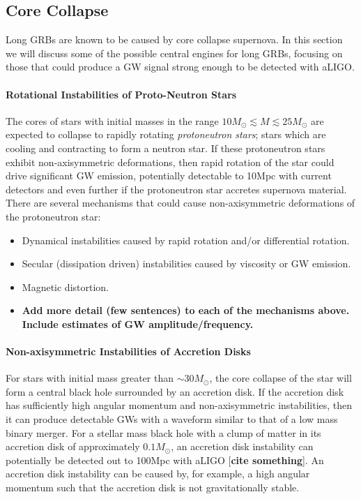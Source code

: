 \documentclass[11pt]{cuthesis}
\begin{document}
\subsection{Core Collapse}
Long GRBs are known to be caused by core collapse supernova. In this section we will discuss some of the possible central engines for long GRBs, focusing on those that could produce a GW signal strong enough to be detected with aLIGO. 

\paragraph{Rotational Instabilities of Proto-Neutron Stars} 
The cores of stars with initial masses in the range $10M_\odot \lesssim M \lesssim 25M_\odot$ are expected to collapse to rapidly rotating \textit{protoneutron stars}; stars which are cooling and contracting to form a neutron star. If these protoneutron stars exhibit non-axisymmetric deformations, then rapid rotation of the star could drive significant GW emission, potentially detectable to 10Mpc with current detectors and even further if the protoneutron star accretes supernova material. There are several mechanisms that could cause non-axisymmetric deformations of the protoneutron star:
\begin{itemize}
\item Dynamical instabilities caused by rapid rotation and/or differential rotation.
\item Secular (dissipation driven) instabilities caused by viscosity or GW emission.
\item Magnetic distortion.
\end{itemize} 

\begin{itemize}
\item \textbf{Add more detail (few sentences) to each of the mechanisms above. Include estimates of GW amplitude/frequency.}
\end{itemize}

\paragraph{Non-axisymmetric Instabilities of Accretion Disks}
For stars with initial mass greater than $\sim 30M_\odot$, the core collapse of the star will form a central black hole surrounded by an accretion disk. If the accretion disk has sufficiently high angular momentum and non-axisymmetric instabilities, then it can produce detectable GWs with a waveform similar to that of a low mass binary merger. For a stellar mass black hole with a clump of matter in its accretion disk of approximately $0.1M_\odot$, an accretion disk instability can potentially be detected out to 100Mpc with aLIGO [\textbf{cite something}]. An accretion disk instability can be caused by, for example, a high angular momentum such that the accretion disk is not gravitationally stable. 
\end{document}
